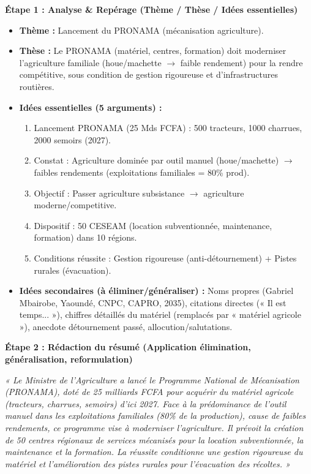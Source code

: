 \documentclass[11pt]{article}
\begin{document}
\begin{exoresolu}
\textbf{Étape 1 : Analyse \& Repérage (Thème / Thèse / Idées essentielles)}
\begin{itemize}
\item \textbf{Thème :} Lancement du PRONAMA (mécanisation agriculture).
\item \textbf{Thèse :} Le PRONAMA (matériel, centres, formation) doit moderniser l'agriculture familiale (houe/machette $\rightarrow$ faible rendement) pour la rendre compétitive, sous condition de gestion rigoureuse et d'infrastructures routières.
\item \textbf{Idées essentielles (5 arguments) :}
    \begin{enumerate}
    \item Lancement PRONAMA (25 Mds FCFA) : 500 tracteurs, 1000 charrues, 2000 semoirs (2027).
    \item Constat : Agriculture dominée par outil manuel (houe/machette) $\rightarrow$ faibles rendements (exploitations familiales = 80\% prod).
    \item Objectif : Passer agriculture subsistance $\rightarrow$ agriculture moderne/competitive.
    \item Dispositif : 50 CESEAM (location subventionnée, maintenance, formation) dans 10 régions.
    \item Conditions réussite : Gestion rigoureuse (anti-détournement) + Pistes rurales (évacuation).
    \end{enumerate}
\item \textbf{Idées secondaires (à éliminer/généraliser) :} Noms propres (Gabriel Mbairobe, Yaoundé, CNPC, CAPRO, 2035), citations directes (« Il est temps... »), chiffres détaillés du matériel (remplacés par « matériel agricole »), anecdote détournement passé, allocution/salutations.
\end{itemize}

\textbf{Étape 2 : Rédaction du résumé (Application élimination, généralisation, reformulation)}

\textit{« Le Ministre de l'Agriculture a lancé le Programme National de Mécanisation (PRONAMA), doté de 25 milliards FCFA pour acquérir du matériel agricole (tracteurs, charrues, semoirs) d'ici 2027. Face à la prédominance de l'outil manuel dans les exploitations familiales (80\% de la production), cause de faibles rendements, ce programme vise à moderniser l'agriculture. Il prévoit la création de 50 centres régionaux de services mécanisés pour la location subventionnée, la maintenance et la formation. La réussite conditionne une gestion rigoureuse du matériel et l'amélioration des pistes rurales pour l'évacuation des récoltes. »}


\end{exoresolu}
\end{document}
